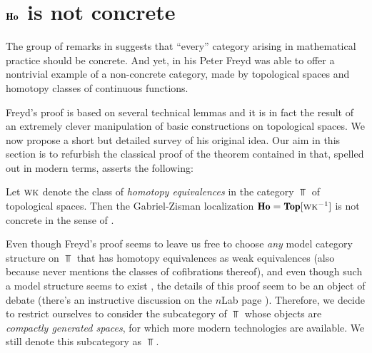 \documentclass[a4paper, 10pt]{amsart}
\begin{document}
\section{$\cate{Ho}$ is not concrete}
The group of remarks in  suggests that ``every'' category arising in mathematical practice should be concrete. And yet, in his \cite{fconc} Peter Freyd was able to offer a nontrivial example of a non-concrete category, made by topological spaces and homotopy classes of continuous functions.

Freyd's proof is based on several technical lemmas and it is in fact the result of an extremely clever manipulation of basic constructions on topological spaces. We now propose a short but detailed survey of his original idea.
Our aim in this section is to refurbish the classical proof of the theorem contained in \cite{fconc} that, spelled out in modern terms, asserts the following:
\begin{theorem}\label{honoconc}
Let $\textsc{wk}$ denote the class of \emph{homotopy equivalences} in the category $\Top$ of topological spaces. Then the Gabriel-Zisman localization \cite{GZ} $\cate{Ho}=\Top[\wk^{-1}]$ is not concrete in the sense of \adef{}.
\end{theorem}
\begin{remark}
Even though Freyd's proof seems to leave us free to choose \emph{any} model category structure on $\Top$ that has homotopy equivalences as weak equivalences (also because \cite{fconc} never mentions the classes of cofibrations thereof), and even though such a model structure seems to exist \cite{strom1972homotopy}, the details of this proof seem to be an object of debate (there's an instructive discussion on the $n$Lab page \cite{nlabstrommodel}). Therefore, we decide to restrict ourselves to consider the subcategory of $\Top$ whose objects are \emph{compactly generated spaces}, for which more modern technologies are available. We still denote this subcategory as $\Top$.
\end{remark}
\end{document}
